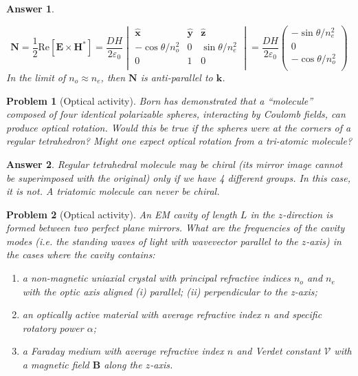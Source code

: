 \documentclass[a4paper]{article}
\newtheorem{ans}{Answer}
\theoremstyle{new}
\newtheorem{qns}{Problem}
\begin{document}
\begin{ans}
\begin{enumerate}[label=(\alph*)]
$$\mathbf{N}=\frac{1}{2}\text{Re}[\mathbf{E}\times\mathbf{H}^*]=\frac{DH}{2\varepsilon_0}\begin{vmatrix}\mathbf{\hat{x}}&\mathbf{\hat{y}}&\mathbf{\hat{z}}\\-\cos\theta/n_o^2&0&\sin\theta/n_e^2\\0&1&0\\\end{vmatrix}=\frac{DH}{2\varepsilon_0}\begin{pmatrix}-\sin\theta/n_e^2\\0\\-\cos\theta/n_o^2\\\end{pmatrix}$$
In the limit of $n_o\approx n_e$, then $\mathbf{N}$ is anti-parallel to $\mathbf{k}$.
\end{enumerate}
\end{ans}
\begin{qns}[Optical activity]
Born has demonstrated that a “molecule” composed of four identical polarizable spheres, interacting by Coulomb fields, can produce optical rotation. Would this be true if the spheres were at the corners of a regular tetrahedron? Might one expect optical rotation from a tri-atomic molecule?
\end{qns}
\begin{ans}
Regular tetrahedral molecule may be chiral (its mirror image cannot be superimposed with the original) only if we have 4 different groups. In this case, it is not. A triatomic molecule can never be chiral.
\end{ans}
\newpage
\begin{qns}[Optical activity]
An EM cavity of length $L$ in the $z$-direction is formed between two perfect plane mirrors. What are the frequencies of the cavity modes (i.e. the standing waves of light with wavevector parallel to the $z$-axis) in the cases where the cavity contains:
\begin{enumerate}[label=(\alph*)]
\item a non-magnetic uniaxial crystal with principal refractive indices $n_o$ and $n_e$ with the optic axis aligned (i) parallel; (ii) perpendicular to the z-axis;
\item an optically active material with average refractive index $n$ and specific rotatory power $\alpha$;
\item a Faraday medium with average refractive index $n$ and Verdet constant $\mathcal{V}$ with a magnetic field $\mathbf{B}$ along the $z$-axis.
\end{enumerate}
\end{qns}
\end{document}
